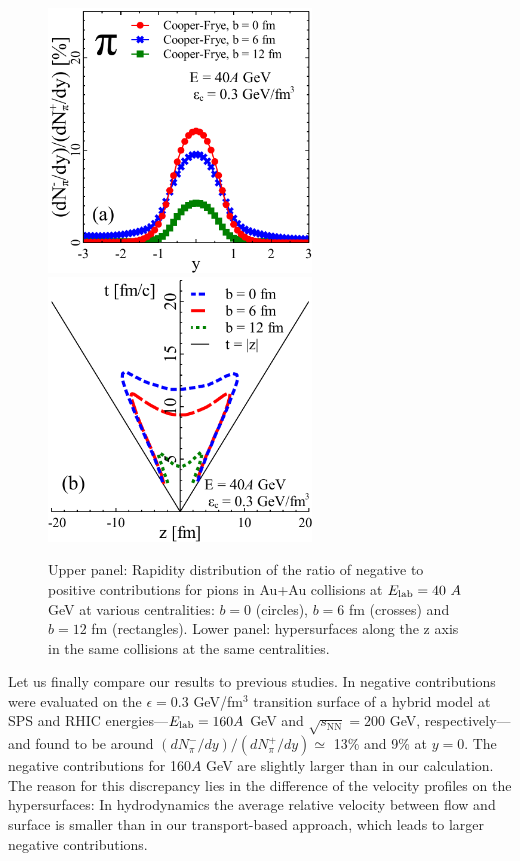 \begin{figure}[htp]
\includegraphics[height=7cm]{plots/cooper_frye/neg_contr_b_v2.pdf}
\includegraphics[height=7cm]{plots/cooper_frye/TZ_vs_b.pdf}
\caption{ Upper panel: Rapidity distribution of the
  ratio of negative to positive contributions for pions in Au+Au
  collisions at $E_\mathrm{lab} = 40\ A$ GeV at various centralities: $b=0$
  (circles), $b = 6$ fm (crosses) and $b = 12$ fm (rectangles). Lower
  panel: hypersurfaces along the z axis in the same collisions at the
  same centralities.}
\label{Fig:neg_contr_b}
\end{figure}

Let us finally compare our results to previous studies. In
\cite{Huovinen:2012is} negative contributions were evaluated on the
$\epsilon = 0.3$ GeV/fm$^3$ transition surface of a hybrid model at
SPS and RHIC energies---$E_\mathrm{lab} = 160A$ GeV and
$\sqrt{s_\mathrm{NN}} = 200$ GeV, respectively---and found to be
around $(dN^{-}_{\pi}/dy)/(dN^{+}_{\pi}/dy) \simeq$ 13\% and 9\% at
$y=0$. The negative contributions for 160$A$ GeV are slightly larger
than in our calculation. The reason for this discrepancy lies in the
difference of the velocity profiles on the hypersurfaces: In
hydrodynamics the average relative velocity between flow and surface
is smaller than in our transport-based approach, which leads to larger
negative contributions.

